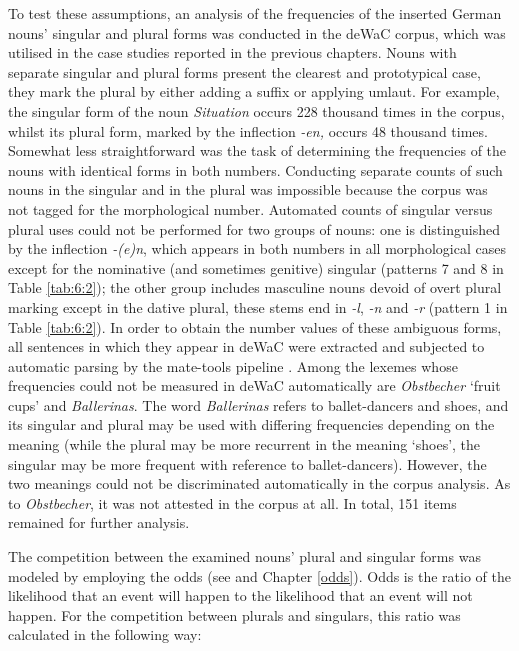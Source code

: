To test these assumptions, an analysis of the frequencies of the inserted German nouns’ singular and plural forms was conducted in the deWaC corpus, which was utilised in the case studies reported in the previous chapters. Nouns with separate singular and plural forms present the clearest and prototypical case, they mark the plural by either adding a suffix or applying umlaut. For example, the singular form of the noun \textit{Situation} occurs 228 thousand times in the corpus, whilst its plural form, marked by the inflection \textit{-en,} occurs 48 thousand times. Somewhat less straightforward was the task of determining the frequencies of the nouns with identical forms in both numbers. Conducting separate counts of such nouns in the singular and in the plural was impossible because the corpus was not tagged for the morphological number. Automated counts of singular versus plural uses could not be performed for two groups of nouns: one is distinguished by the inflection \textit{-(e)n}, which appears in both numbers in all morphological cases except for the nominative (and sometimes genitive) singular (patterns 7 and 8 in Table \ref{tab:6:2}); the other group includes masculine nouns devoid of overt plural marking except in the dative plural, these stems end in \textit{-l}, \textit{-n} and \textit{-r} (pattern 1 in Table \ref{tab:6:2}). In order to obtain the number values of these ambiguous forms, all sentences in which they appear in deWaC were extracted and subjected to automatic parsing by the mate-tools pipeline \citep{bjorkelund-etal10}. Among the lexemes whose frequencies could not be measured in deWaC automatically are \textit{Obstbecher} `fruit cups' and \textit{Ballerinas}. The word \textit{Ballerinas} refers to ballet-dancers and shoes, and its singular and plural may be used with differing frequencies depending on the meaning (while the plural may be more recurrent in the meaning ‘shoes’, the singular may be more frequent with reference to ballet-dancers). However, the two meanings could not be discriminated automatically in the corpus analysis. As to \textit{Obstbecher}, it was not attested in the corpus at all. In total, 151 items remained for further analysis.

The competition between the examined nouns’ plural and singular forms was modeled by employing the odds (see \citealt[119]{fahrmeir-etal-2007} and Chapter \ref{odds}). Odds is the ratio of the likelihood that an event will happen to the likelihood that an event will not happen. For the competition between plurals and singulars, this ratio was calculated in the following way:

